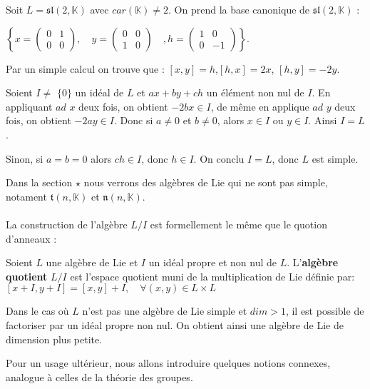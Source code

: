\documentclass[a4paper,openany,12pt]{report}
\newcommand{\KK}{\mathbb{K}}
\newcommand{\ssl}{\mathfrak{sl}}
\newcommand{\ttt}{\mathfrak{t}}
\newcommand{\nn}{\mathfrak{n}}
\theoremstyle{break}
{\theorembodyfont{\upshape}
\newtheorem*{rmq}{Remarque :}
\newtheorem*{prv}{Preuve :}
\newtheorem*{ex}{Exemples :}
\newtheorem*{exe}{Exemple : }
\newtheorem*{nota}{Notation :}
\newtheorem*{dem}{D\'emonstration :}}
\begin{document}
\begin{exe}
\quad Soit $L = \ssl(2,\KK)$ avec $car(\KK)\ne 2$. On prend la base canonique de $\ssl(2,\KK)$ : 
\begin{center}
$\left \{ x=\begin{pmatrix} 0 & 1\\ 0 & 0 \end{pmatrix},\quad y=\begin{pmatrix} 0 & 0\\ 1 & 0 \end{pmatrix}\quad, h=\begin{pmatrix} 1 & 0\\ 0 & -1 \end{pmatrix} \right \}$.
\end{center} 
Par un simple calcul on trouve que : $[x,y]=h$,\quad $[h,x]=2x$, \quad $[h,y]=-2y$.

Soient $I \ne$ $\{0 \}$ un idéal de $L$ et $ax+by+ch$ un élément non nul de $I$. En appliquant  $ad$ $x$ deux fois, on obtient $-2bx\in I$, de même en applique $ad$ $y$ deux fois, on obtient $-2ay\in I$. Donc si $a \ne 0$ et $b \ne 0$, alors $x \in I $ ou $y \in I$. Ainsi $I=L$.

Sinon, si $a = b = 0$ alors $ch \in I$, donc $h \in I$. On conclu $I=L$, donc $L$ est simple.
\end{exe}

Dans la section $\star$ nous verrons des algèbres de Lie qui ne sont pas simple, notament $\ttt(n,\KK)$ et $\nn(n,\KK)$.\\
\\
\quad La construction de l'algèbre $L/I$ est formellement le même que le quotion d'anneaux :

\begin{df}
\quad Soient $L$ une algèbre de Lie et $I$ un idéal propre et non nul de $L$. L'\textbf{algèbre quotient} $L/I$ est l'espace quotient muni de la multiplication de Lie définie par:
\center $[x+I, y+I]=[x, y]+I, \quad \forall(x, y) \in L \times L$
\end{df}

\begin{rmq}
\quad Dans le cas où $L$ n'est pas une algèbre de Lie simple et $dim>1$, il est possible de factoriser par un idéal propre non nul. On obtient ainsi une algèbre de Lie de dimension plus petite.
\end{rmq}

Pour un usage ultérieur, nous allons introduire quelques notions connexes, analogue à celles de la théorie des groupes.
\end{document}
